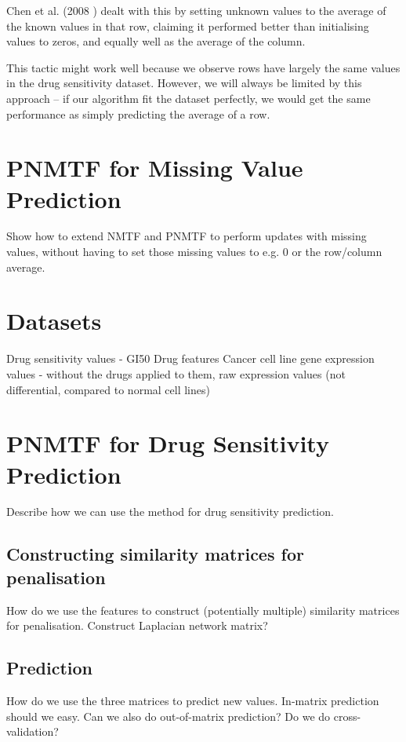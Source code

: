 \documentclass{article}
\begin{document}
			Chen et al. (2008 \cite{chen_2007}) dealt with this by setting unknown values to the average of the known values in that row, claiming it performed better than initialising values to zeros, and equally well as the average of the column.
			
			This tactic might work well because we observe rows have largely the same values in the drug sensitivity dataset. However, we will always be limited by this approach -- if our algorithm fit the dataset perfectly, we would get the same performance as simply predicting the average of a row.
			
			
			
	\section{PNMTF for Missing Value Prediction}
		Show how to extend NMTF and PNMTF to perform updates with missing values, without having to set those missing values to e.g. 0 or the row/column average.
	
					
	\section{Datasets}
		Drug sensitivity values - GI50
		Drug features
		Cancer cell line gene expression values - without the drugs applied to them, raw expression values (not differential, compared to normal cell lines)
	
			
	\section{PNMTF for Drug Sensitivity Prediction}
		Describe how we can use the method for drug sensitivity prediction.
		
		\subsection{Constructing similarity matrices for penalisation}
			How do we use the features to construct (potentially multiple) similarity matrices for penalisation. Construct Laplacian network matrix?
			
		\subsection{Prediction}
			How do we use the three matrices to predict new values. In-matrix prediction should we easy.
			Can we also do out-of-matrix prediction?
			Do we do cross-validation? 
			
\end{document}
